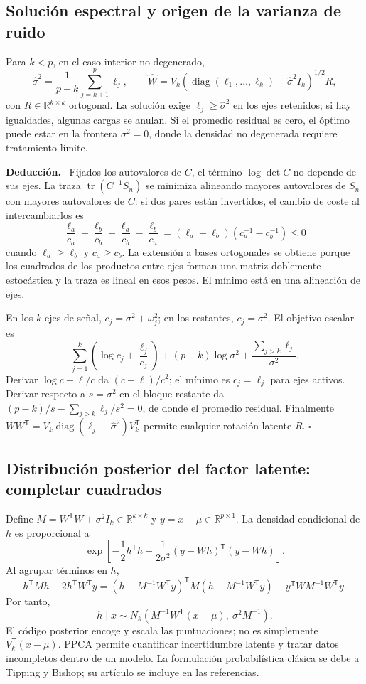\documentclass[11pt,a4paper]{article}
\newcommand{\R}{\mathbb R}
\newcommand{\T}{^{\mathsf T}}
\DeclareMathOperator{\tr}{tr}
\newenvironment{deduccion}{\par\textbf{Deducción.}\ }{\hfill$\square$\par}
\DeclareMathOperator{\diag}{diag}
\theoremstyle{definition}
\begin{document}
\subsection{Solución espectral y origen de la varianza de ruido}
Para $k<p$, en el caso interior no degenerado,
\[
\widehat\sigma^2=\frac1{p-k}\sum_{j=k+1}^p\ell_j,\qquad
\widehat W=V_k(\operatorname{diag}(\ell_1,\ldots,\ell_k)-\widehat\sigma^2I_k)^{1/2}R,
\]
con $R\in\R^{k\times k}$ ortogonal. La solución exige $\ell_j\ge\widehat\sigma^2$ en los ejes retenidos; si hay igualdades, algunas cargas se anulan. Si el promedio residual es cero, el óptimo puede estar en la frontera $\sigma^2=0$, donde la densidad no degenerada requiere tratamiento límite.
\begin{deduccion}
Fijados los autovalores de $C$, el término $\log\det C$ no depende de sus ejes. La traza $\tr(C^{-1}S_n)$ se minimiza alineando mayores autovalores de $S_n$ con mayores autovalores de $C$: si dos pares están invertidos, el cambio de coste al intercambiarlos es
\[
\frac{\ell_a}{c_a}+\frac{\ell_b}{c_b}-\frac{\ell_a}{c_b}-\frac{\ell_b}{c_a}
=(\ell_a-\ell_b)(c_a^{-1}-c_b^{-1})\le0
\]
cuando $\ell_a\ge\ell_b$ y $c_a\ge c_b$. La extensión a bases ortogonales se obtiene porque los cuadrados de los productos entre ejes forman una matriz doblemente estocástica y la traza es lineal en esos pesos. El mínimo está en una alineación de ejes.

En los $k$ ejes de señal, $c_j=\sigma^2+\omega_j^2$; en los restantes, $c_j=\sigma^2$. El objetivo escalar es
\[
\sum_{j=1}^k\left(\log c_j+\frac{\ell_j}{c_j}\right)
+(p-k)\log\sigma^2+\frac{\sum_{j>k}\ell_j}{\sigma^2}.
\]
Derivar $\log c+\ell/c$ da $(c-\ell)/c^2$; el mínimo es $c_j=\ell_j$ para ejes activos. Derivar respecto a $s=\sigma^2$ en el bloque restante da $(p-k)/s-\sum_{j>k}\ell_j/s^2=0$, de donde el promedio residual. Finalmente $WW\T=V_k\diag(\ell_j-\widehat\sigma^2)V_k\T$ permite cualquier rotación latente $R$.
\end{deduccion}
\subsection{Distribución posterior del factor latente: completar cuadrados}
Define $M=W\T W+\sigma^2I_k\in\R^{k\times k}$ y $y=x-\mu\in\R^{p\times1}$. La densidad condicional de $h$ es proporcional a
\[
\exp\left[-\frac12h\T h-\frac1{2\sigma^2}(y-Wh)\T(y-Wh)\right].
\]
Al agrupar términos en $h$,
\[
h\T Mh-2h\T W\T y
=(h-M^{-1}W\T y)\T M(h-M^{-1}W\T y)-y\T WM^{-1}W\T y.
\]
Por tanto,
\[
\boxed{h\mid x\sim N_k(M^{-1}W\T(x-\mu),\ \sigma^2M^{-1})}.
\]
El código posterior encoge y escala las puntuaciones; no es simplemente $V_k\T(x-\mu)$. PPCA permite cuantificar incertidumbre latente y tratar datos incompletos dentro de un modelo. La formulación probabilística clásica se debe a Tipping y Bishop; su artículo se incluye en las referencias.
\end{document}
